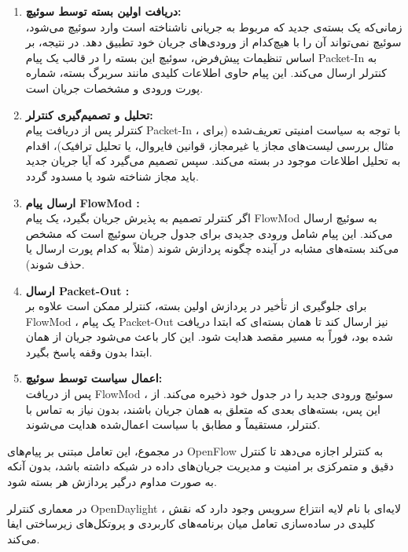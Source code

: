 \begin{enumerate}
	\item \textbf{دریافت اولین بسته توسط سوئیچ:} \\
	زمانی‌که یک بسته‌ی جدید که مربوط به جریانی ناشناخته است وارد سوئیچ می‌شود، سوئیچ نمی‌تواند آن را با هیچ‌کدام از ورودی‌های جریان خود تطبیق دهد. در نتیجه، بر اساس تنظیمات پیش‌فرض، سوئیچ این بسته را در قالب یک پیام {Packet-In} به کنترلر ارسال می‌کند. این پیام حاوی اطلاعات کلیدی مانند سربرگ بسته، شماره پورت ورودی و مشخصات جریان است.
	
	\item \textbf{تحلیل و تصمیم‌گیری کنترلر:} \\
	کنترلر پس از دریافت پیام Packet-In ، با توجه به سیاست امنیتی تعریف‌شده (برای مثال بررسی لیست‌های مجاز یا غیرمجاز، قوانین فایروال، یا تحلیل ترافیک)، اقدام به تحلیل اطلاعات موجود در بسته می‌کند. سپس تصمیم می‌گیرد که آیا جریان جدید باید مجاز شناخته شود یا مسدود گردد.
	
	\item \textbf{ارسال پیام FlowMod :} \\
	اگر کنترلر تصمیم به پذیرش جریان بگیرد، یک پیام {FlowMod} به سوئیچ ارسال می‌کند. این پیام شامل ورودی جدیدی برای جدول جریان سوئیچ است که مشخص می‌کند بسته‌های مشابه در آینده چگونه پردازش شوند (مثلاً به کدام پورت ارسال یا حذف شوند).
	
	\item \textbf{ارسال Packet-Out :} \\
	برای جلوگیری از تأخیر در پردازش اولین بسته، کنترلر ممکن است علاوه بر FlowMod ، یک پیام {Packet-Out} نیز ارسال کند تا همان بسته‌ای که ابتدا دریافت شده بود، فوراً به مسیر مقصد هدایت شود. این کار باعث می‌شود جریان از همان ابتدا بدون وقفه پاسخ بگیرد.
	
	\item \textbf{اعمال سیاست توسط سوئیچ:} \\
	پس از دریافت FlowMod ، سوئیچ ورودی جدید را در جدول خود ذخیره می‌کند. از این پس، بسته‌های بعدی که متعلق به همان جریان باشند، بدون نیاز به تماس با کنترلر، مستقیماً و مطابق با سیاست اعمال‌شده هدایت می‌شوند.
	
\end{enumerate}

در مجموع، این تعامل مبتنی بر پیام‌های OpenFlow به کنترلر اجازه می‌دهد تا کنترل دقیق و متمرکزی بر امنیت و مدیریت جریان‌های داده در شبکه داشته باشد، بدون آنکه به صورت مداوم درگیر پردازش هر بسته شود.



در معماری کنترلر {OpenDaylight} ، لایه‌ای با نام {لایه انتزاع سرویس} وجود دارد که نقش کلیدی در ساده‌سازی تعامل میان برنامه‌های کاربردی و پروتکل‌های زیرساختی ایفا می‌کند.

